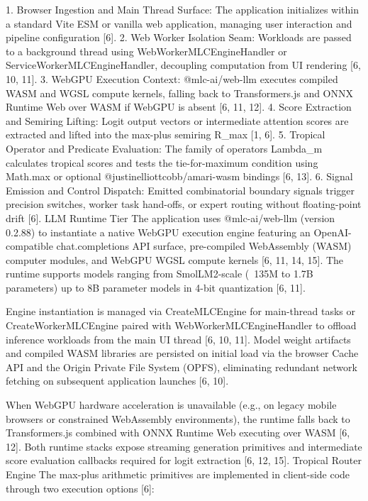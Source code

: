 1. Browser Ingestion and Main Thread Surface: The application initializes within a standard Vite ESM or vanilla web application, managing user interaction and pipeline configuration [6].
2. Web Worker Isolation Seam: Workloads are passed to a background thread using WebWorkerMLCEngineHandler or ServiceWorkerMLCEngineHandler, decoupling computation from UI rendering [6, 10, 11].
3. WebGPU Execution Context: @mlc-ai/web-llm executes compiled WASM and WGSL compute kernels, falling back to Transformers.js and ONNX Runtime Web over WASM if WebGPU is absent [6, 11, 12].
4. Score Extraction and Semiring Lifting: Logit output vectors or intermediate attention scores are extracted and lifted into the max-plus semiring R_max [1, 6].
5. Tropical Operator and Predicate Evaluation: The family of operators Lambda_m calculates tropical scores and tests the tie-for-maximum condition using Math.max or optional @justinelliottcobb/amari-wasm bindings [6, 13].
6. Signal Emission and Control Dispatch: Emitted combinatorial boundary signals trigger precision switches, worker task hand-offs, or expert routing without floating-point drift [6].
LLM Runtime Tier
The application uses @mlc-ai/web-llm (version 0.2.88) to instantiate a native WebGPU execution engine featuring an OpenAI-compatible chat.completions API surface, pre-compiled WebAssembly (WASM) computer modules, and WebGPU WGSL compute kernels [6, 11, 14, 15]. The runtime supports models ranging from SmolLM2-scale (~135M to 1.7B parameters) up to 8B parameter models in 4-bit quantization [6, 11].


Engine instantiation is managed via CreateMLCEngine for main-thread tasks or CreateWorkerMLCEngine paired with WebWorkerMLCEngineHandler to offload inference workloads from the main UI thread [6, 10, 11]. Model weight artifacts and compiled WASM libraries are persisted on initial load via the browser Cache API and the Origin Private File System (OPFS), eliminating redundant network fetching on subsequent application launches [6, 10].


When WebGPU hardware acceleration is unavailable (e.g., on legacy mobile browsers or constrained WebAssembly environments), the runtime falls back to Transformers.js combined with ONNX Runtime Web executing over WASM [6, 12]. Both runtime stacks expose streaming generation primitives and intermediate score evaluation callbacks required for logit extraction [6, 12, 15].
Tropical Router Engine
The max-plus arithmetic primitives are implemented in client-side code through two execution options [6]:


